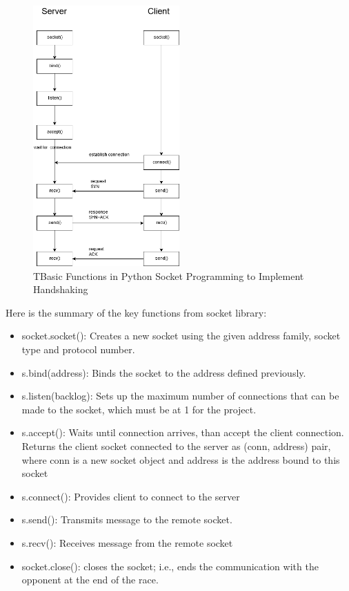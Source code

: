 \documentclass[a4paper,12pt]{article}
\begin{document}
	\begin{figure}[h]
		\center
		\setlength{\unitlength}{\textwidth} 
		\includegraphics[width=0.5\textwidth]{images/socket_funcs}
		\caption{\label{fig:socket_funcs}TBasic Functions in Python Socket Programming to Implement Handshaking}
	\end{figure}
	
	Here is the summary of the key functions from socket library:
	
	\begin{itemize}
		\item socket.socket(): Creates a new socket using the given address family, socket type and protocol number.
		\item s.bind(address): Binds the socket to the address defined previously.
		\item s.listen(backlog): Sets up the maximum number of connections that can be made to the socket, which must be at 1 for the project.
		\item	s.accept(): Waits until connection arrives, than accept the client connection. Returns the client socket connected to the server as (conn, address) pair, where conn is a new socket object and address is the address bound to this socket
		\item	s.connect(): Provides client to connect to the server
		\item	s.send(): Transmits message to the remote socket.
		\item	s.recv(): Receives message from the remote socket
		\item	socket.close(): closes the socket; i.e., ends the communication with the opponent at the end of the race.
	\end{itemize}
	
\end{document}
